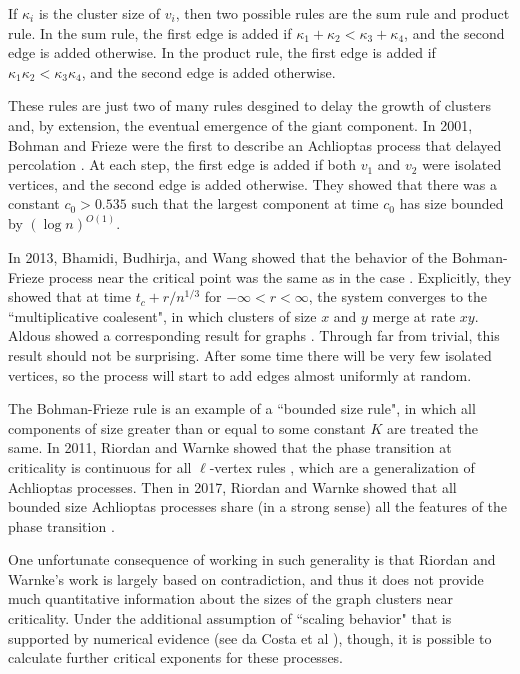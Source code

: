 \documentclass[twoside,10pt]{article}
\begin{document}
If $\kappa_i$ is the cluster size of $v_{i}$, then two possible rules are the sum rule and product rule. In the sum rule, the first edge is added if $\kappa_1+\kappa_2 < \kappa_3+\kappa_4$, and the second edge is added otherwise. In the product rule, the first edge is added if $\kappa_1 \kappa_2 < \kappa_3 \kappa_4$, and the second edge is added otherwise.

These rules are just two of many rules desgined to delay the growth of clusters and, by extension, the eventual emergence of the giant component. In 2001, Bohman and Frieze were the first to describe an Achlioptas process that delayed percolation \cite{BF}. At each step, the first edge is added if both $v_1$ and $v_2$ were isolated vertices, and the second edge is added otherwise. They showed that there was a constant $c_0>0.535$ such that the largest component at time $c_0$ has size bounded by $(\log n)^{O(1)}$.

In 2013, Bhamidi, Budhirja, and Wang showed that the behavior of the Bohman-Frieze process near the critical point was the same as in the \ER case \cite{coal}. Explicitly, they showed that at time $t_c + r/n^{1/3}$ for $-\infty<r<\infty$, the system converges to the ``multiplicative coalesent", in which clusters of size $x$ and $y$ merge at rate $xy$. Aldous showed a corresponding result for \ER graphs \cite{Aldous}. Through far from trivial, this result should not be surprising. After some time there will be very few isolated vertices, so the process will start to add edges almost uniformly at random.

The Bohman-Frieze rule is an example of a ``bounded size rule", in which all components of size greater than or equal to some constant $K$ are treated the same. In 2011, Riordan and Warnke showed that the phase transition at criticality is continuous for all $\ell$-vertex rules \cite{RW-cont}, which are a generalization of Achlioptas processes. Then in 2017, Riordan and Warnke showed that all bounded size Achlioptas processes share (in a strong sense) all the features of the \ER phase transition \cite{RW-bounded}.

One unfortunate consequence of working in such generality is that Riordan and Warnke's work is largely based on contradiction, and thus it does not provide much quantitative information about the sizes of the graph clusters near criticality. Under the additional assumption of ``scaling behavior" that is supported by numerical evidence (see da Costa et al \cite{daCosta}), though, it is possible to calculate further critical exponents for these processes.
\end{document}

